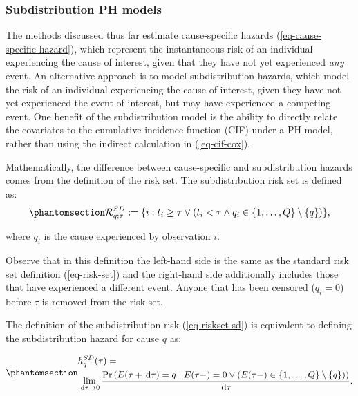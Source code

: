 \documentclass[
  letterpaper,
  krantz2]{style/krantz}
\begin{document}
\subsubsection{Subdistribution PH
models}\label{subdistribution-ph-models}

The methods discussed thus far estimate cause-specific hazards
(\ref{eq-cause-specific-hazard}), which represent the instantaneous risk
of an individual experiencing the cause of interest, given that they
have not yet experienced \emph{any} event.
 An alternative approach is
to model subdistribution hazards, which model the risk of an individual
experiencing the cause of interest, given they have not yet experienced
the event of interest, but may have experienced a competing event. One
benefit of the subdistribution model is the ability to directly relate
the covariates to the cumulative incidence function (CIF) under a PH
model, rather than using the indirect calculation in (\ref{eq-cif-cox}).

Mathematically, the difference between cause-specific and
subdistribution hazards comes from the definition of the risk set. The
subdistribution risk set is defined as: 
\begin{equation}\phantomsection\label{eq-riskset-sd}{
\mathcal{R}^{SD}_{q;\tau} := \{i: t_i \geq \tau \vee \left(t_i < \tau \wedge q_i \in \{1,\ldots,Q\} \setminus \{q\}\right)\},
}\end{equation}

where \(q_i\) is the cause experienced by observation \(i\).

Observe that in this definition the left-hand side is the same as the
standard risk set definition (\ref{eq-risk-set}) and the right-hand side
additionally includes those that have experienced a different event.
Anyone that has been censored (\(q_i = 0\)) before \(\tau\) is removed
from the risk set.

The definition of the subdistribution risk (\ref{eq-riskset-sd}) is
equivalent to defining the subdistribution hazard for cause \(q\) as:

\begin{equation}\phantomsection\label{eq-hazard-sd}{
\begin{aligned}
&h^{SD}_{q}(\tau) = \\
&\lim_{\,\mathrm{d}\tau\to 0} \frac{\Pr\left(E(\tau + \,\mathrm{d}\tau) = q \mid E(\tau-) = 0 \vee \left(E(\tau-) \in \{1,\ldots,Q\} \setminus \{q\}\right)\right)}{\,\mathrm{d}\tau}.
\end{aligned}
}\end{equation}
\end{document}

